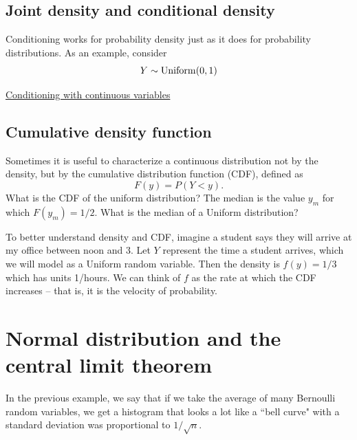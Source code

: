  \subsection{Joint density and conditional density}
 
 Conditioning works for probability density just as it does for probability distributions. As an example, consider
 \begin{equation}
 Y \sim {\rm Uniform}(0,1)
 \end{equation}
 
 \begin{example}
\href{}{Conditioning with continuous variables} 
 \end{example}
 
 \subsection{Cumulative density function}
Sometimes it is useful to characterize a continuous distribution not by the density, but by the {\dfn cumulative distribution function (CDF)}, defined as 
\begin{equation}
F(y) = P(Y<y).
\end{equation}
What is the CDF of the uniform distribution? The {\dfn median} is the value $y_m$ for which $F(y_m) = 1/2$. What is the median of a Uniform distribution?  
  
  
  To better understand density and CDF, imagine a student says they will arrive at my office between noon and 3. Let $Y$ represent the time a student arrives, which we will model as a Uniform random variable. Then the density is $f(y) = 1/3$ which has units 1/hours. We can think of $f$ as the rate at which the CDF increases -- that is, it is the velocity of probability. 
  
  
  
  
  \section{Normal distribution and the central limit theorem}

In the previous example, we say that if we take the average of many Bernoulli random variables, we get a histogram that looks a lot like a ``bell curve" with a standard deviation was proportional to $1/\sqrt{n}$.

